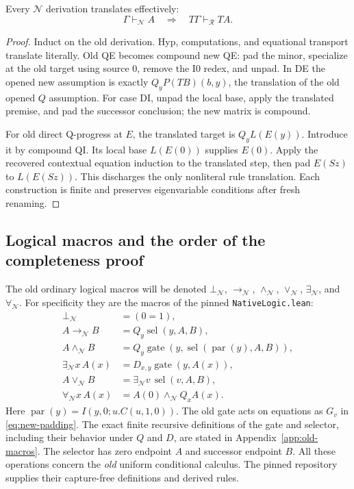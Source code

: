 \begin{theorem}
\label{thm:new-T}
Every $\mathcal N$ derivation translates effectively:
\[
 \Gamma\vdash_{\mathcal N}A
 \quad\Longrightarrow\quad
 T\Gamma\vdash_{\mathcal R}TA.
\]
\end{theorem}
\begin{proof}
Induct on the old derivation.  Hyp, computations, and equational transport
translate literally.  Old QE becomes compound new QE: pad the minor,
specialize at the old target using source $0$, remove the I0 redex, and
unpad.  In DE the opened new assumption is exactly
$Q_yP(TB)(b,y)$, the translation of the old opened $Q$ assumption.
For case DI, unpad the local base, apply the translated premise, and pad
the successor conclusion; the new matrix is compound.

For old direct Q-progress at $E$, the translated target is $Q_yL(E(y))$.
Introduce it by compound QI.  Its local base $L(E(0))$ supplies $E(0)$.
Apply the recovered contextual equation induction to the translated step,
then pad $E(Sz)$ to $L(E(Sz))$.  This discharges the only nonliteral rule
translation.  Each construction is finite and preserves eigenvariable
conditions after fresh renaming.
\end{proof}

\subsection{Logical macros and the order of the completeness proof}
\label{subsec:new-image-logic}

The old ordinary logical macros will be denoted
$\bot_{\mathcal N}$, $\to_{\mathcal N}$, $\wedge_{\mathcal N}$,
$\vee_{\mathcal N}$, $\exists_{\mathcal N}$, and $\forall_{\mathcal N}$.
For specificity they are the macros of the pinned
\texttt{NativeLogic.lean}:\cite{native}
\begin{equation}
 \begin{aligned}
 \bot_{\mathcal N}&=(0=1),\\
 A\to_{\mathcal N}B&=Q_y\operatorname{sel}(y,A,B),\\
 A\wedge_{\mathcal N}B
   &=Q_y\operatorname{gate}
           (y,\operatorname{sel}(\operatorname{par}(y),A,B)),\\
 \exists_{\mathcal N}x\,A(x)&=D_{x,y}\operatorname{gate}(y,A(x)),\\
 A\vee_{\mathcal N}B&=\exists_{\mathcal N}v\,
                                   \operatorname{sel}(v,A,B),\\
 \forall_{\mathcal N}x\,A(x)&=A(0)\wedge_{\mathcal N}Q_xA(x).
 \end{aligned}
 \label{eq:new-old-macros}
\end{equation}
Here $\operatorname{par}(y)=I(y,0;u.C(u,1,0))$.
The old gate acts on equations as $G_v$ in \eqref{eq:new-padding}.
The exact finite recursive definitions of the gate and selector, including
their behavior under $Q$ and $D$, are stated in Appendix~\ref{app:old-macros}.
The selector has zero endpoint $A$ and successor endpoint $B$.
All these operations concern the \emph{old} uniform conditional calculus.
The pinned repository supplies their capture-free definitions and derived
rules.

